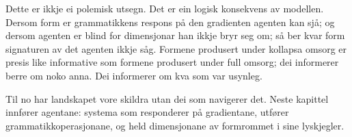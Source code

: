 Dette er ikkje ei polemisk utsegn. Det er ein logisk konsekvens av modellen. Dersom form er grammatikkens respons på den gradienten agenten kan sjå; og dersom agenten er blind for dimensjonar han ikkje bryr seg om; så ber kvar form signaturen av det agenten ikkje såg. Formene produsert under kollapsa omsorg er presis like informative som formene produsert under full omsorg; dei informerer berre om noko anna. Dei informerer om kva som var usynleg.

\begin{overgang}
Til no har landskapet vore skildra utan dei som navigerer det. Neste kapittel innfører agentane: systema som responderer på gradientane, utfører grammatikkoperasjonane, og held dimensjonane av formrommet i sine lyskjegler.
\end{overgang}
